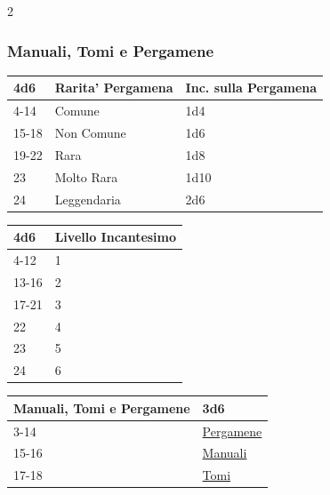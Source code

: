 \begin{multicols}{2}
{\subsubsection{Manuali, Tomi e Pergamene}\hypertarget{manualitomi}{}\label{manualitomi}\label{CPergamene}\hypertarget{CPergamene}{}

{\small \begin{tabularx}{\linewidth}{lll}
		\toprule
\rowcolor{gray!20}\textbf{4d6} & \textbf{Rarita' Pergamena} & \textbf{Inc. sulla Pergamena}\\
\toprule
4-14 &Comune & 1d4 \\
\rowcolor{gray!20}15-18 &Non Comune & 1d6 \\
19-22 &Rara & 1d8 \\
\rowcolor{gray!20}23 & Molto Rara & 1d10\\
24 & Leggendaria & 2d6\\
\end{tabularx}}

\medskip

{\small \begin{tabularx}{\linewidth}{ll}
		\toprule
 \rowcolor{gray!20}\textbf{4d6} & \textbf{Livello Incantesimo}\\
	\toprule
	4-12 & 1 \\
 \rowcolor{gray!20}13-16 & 2 \\
	17-21 & 3  \\
 \rowcolor{gray!20}22 & 4  \\
	23 & 5 \\
 \rowcolor{gray!20}24 & 6 \\
\end{tabularx}}

\medskip

{\small\begin{tabularx}{\linewidth}{ll}
		\toprule
  \rowcolor{gray!20}\textbf{Manuali, Tomi e Pergamene}&\textbf{3d6}\\
		\toprule
3-14 &	\hyperlink{manualitomi}{Pergamene}\\
\rowcolor{gray!20}15-16&	\hyperlink{manualitomi}{Manuali} \\
17-18&	\hyperlink{manualitomi}{Tomi}
\end{tabularx}}

\medskip\hypertarget{Manuali}{}

}
\end{multicols}
